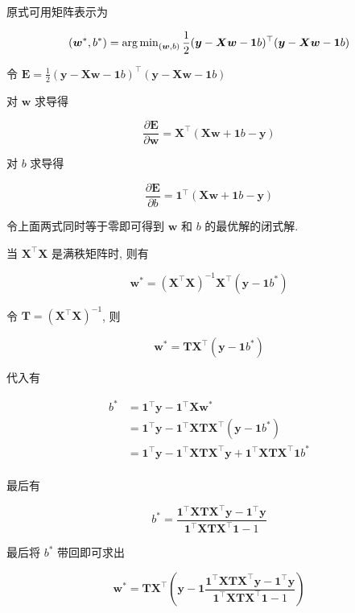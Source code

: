 \documentclass[answers]{exam}  %
\begin{document}
\begin{questions}
  \begin{solution}
    原式可用矩阵表示为

    $$
      (\bm{w}^{*}, b^{*}) = \operatorname{arg\,min}_{(\bm{w}, b)}\frac{1}{2}(\bm{y}-\bm{X}\bm{w}-\bm{1}b)^{\top}(\bm{y}-\bm{X}\bm{w}-\bm{1}b)
    $$

    令 $\displaystyle \bm{E} = \frac{1}{2}(\bm{y}-\bm{X}\bm{w}-\bm{1}b)^{\top}(\bm{y}-\bm{X}\bm{w}-\bm{1}b)$

    对 $\bm{w}$ 求导得

    $$
      \frac{\partial \bm{E}}{\partial \bm{w}} = \bm{X}^{\top}(\bm{X}\bm{w}+\bm{1}b-\bm{y})
    $$

    对 $b$ 求导得

    $$
      \frac{\partial \bm{E}}{\partial b} = \bm{1}^{\top}(\bm{X}\bm{w}+\bm{1}b-\bm{y})
    $$

    令上面两式同时等于零即可得到 $\bm{w}$ 和 $b$ 的最优解的闭式解.

    当 $\bm{X}^{\top}\bm{X}$ 是满秩矩阵时, 则有

    $$
      \bm{w}^{*} = (\bm{X}^{\top}\bm{X})^{-1}\bm{X}^{\top}(\bm{y}-\bm{1}b^{*})
    $$

    令 $\bm{T} = (\bm{X}^{\top}\bm{X})^{-1}$, 则

    $$
      \bm{w}^{*} = \bm{T}\bm{X}^{\top}(\bm{y}-\bm{1}b^{*})
    $$

    代入有

    $$
      \begin{aligned}
        b^{*}
         & = \bm{1}^{\top}\bm{y} - \bm{1}^{\top}\bm{X}\bm{w}^{*}                                                                    \\
         & = \bm{1}^{\top}\bm{y} - \bm{1}^{\top}\bm{X}\bm{T}\bm{X}^{\top}(\bm{y}-\bm{1}b^{*})                                       \\
         & = \bm{1}^{\top}\bm{y} - \bm{1}^{\top}\bm{X}\bm{T}\bm{X}^{\top}\bm{y} + \bm{1}^{\top}\bm{X}\bm{T}\bm{X}^{\top}\bm{1}b^{*} \\
      \end{aligned}
    $$

    最后有

    $$
      b^{*} = \frac{\bm{1}^{\top}\bm{X}\bm{T}\bm{X}^{\top}\bm{y} - \bm{1}^{\top}\bm{y}}{\bm{1}^{\top}\bm{X}\bm{T}\bm{X}^{\top}\bm{1} - 1}
    $$

    最后将 $b^{*}$ 带回即可求出

    $$
      \bm{w}^{*} = \bm{T}\bm{X}^{\top}(\bm{y}-\bm{1}\frac{\bm{1}^{\top}\bm{X}\bm{T}\bm{X}^{\top}\bm{y} - \bm{1}^{\top}\bm{y}}{\bm{1}^{\top}\bm{X}\bm{T}\bm{X}^{\top}\bm{1} - 1})
    $$
  \end{solution}



\end{questions}
\end{document}
